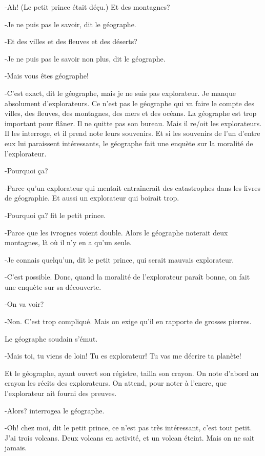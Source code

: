 \documentclass{report}
\begin{document}
\begin{paracol}{2}
-Ah! (Le petit prince était déçu.) Et des montagnes?

-Je ne puis pas le savoir, dit le géographe.

-Et des villes et des fleuves et des déserts?

-Je ne puis pas le savoir non plus, dit le géographe.

-Mais vous êtes géographe!

-C'est exact, dit le géographe, mais je ne suis pas explorateur. Je manque absolument d'explorateurs. Ce n'est pas le géographe qui va faire le compte des villes, des fleuves, des montagnes, des mers et des océans. La géographe est trop important pour flâner. Il ne quitte pas son bureau. Mais il re/oit les explorateurs. Il les interroge, et il prend note leurs souvenirs. Et si les souvenirs de l'un d'entre eux lui paraissent intéressants, le géographe fait une enquète sur la moralité de l'explorateur.

-Pourquoi ça?

-Parce qu'un explorateur qui mentait entraînerait des catastrophes dans les livres de géographie. Et aussi un explorateur qui boirait trop.

-Pourquoi ça? fit le petit prince.

-Parce que les ivrognes voient double. Alors le géographe noterait deux montagnes, là où il n'y en a qu'un seule.

-Je connais quelqu'un, dit le petit prince, qui serait mauvais explorateur.

-C'est possible. Donc, quand la moralité de l'explorateur paraît bonne, on fait une enquète sur sa découverte.

-On va voir?

-Non. C'est trop compliqué. Mais on exige qu'il en rapporte de grosses pierres.

Le géographe soudain s'émut.

-Mais toi, tu viens de loin! Tu es explorateur! Tu vas me décrire ta planète!

Et le géographe, ayant ouvert son régistre, tailla son crayon. On note d'abord au crayon les récits des explorateurs. On attend, pour noter à l'encre, que l'explorateur ait fourni des preuves.

-Alors? interrogea le géographe.

-Oh! chez moi, dit le petit prince, ce n'est pas très intéressant, c'est tout petit. J'ai trois volcans. Deux volcans en activité, et un volcan éteint. Mais on ne sait jamais.


\end{paracol}
\end{document}
